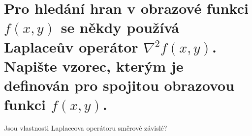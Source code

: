 \section{Pro hledání hran v obrazové funkci \texorpdfstring{$f(x,y)$}{f(x,y)} se někdy používá Laplaceův operátor 
\texorpdfstring{$\nabla^{2}f(x,y)$}{∇2 f(x,y)}. Napište vzorec, kterým je definován pro spojitou obrazovou funkci 
\texorpdfstring{$f(x,y)$}{f(x,y)}.}
Jsou vlastnosti Laplaceova operátoru směrově závislé?